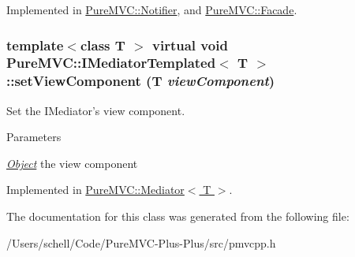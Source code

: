 Implemented in \hyperlink{class_pure_m_v_c_1_1_notifier_a55a358ee2661ecc08400653016fdb497}{PureMVC::Notifier}, and \hyperlink{class_pure_m_v_c_1_1_facade_a39a61e0a65d0f979848d36fe99cfd5f5}{PureMVC::Facade}.\hypertarget{class_pure_m_v_c_1_1_i_mediator_templated_a0eb50a31925283b7d6cdfe5b9dc90163}{
\subsubsection[{setViewComponent}]{\setlength{\rightskip}{0pt plus 5cm}template$<$class T $>$ virtual void {\bf PureMVC::IMediatorTemplated}$<$ T $>$::setViewComponent (T {\em viewComponent})}}
\label{class_pure_m_v_c_1_1_i_mediator_templated_a0eb50a31925283b7d6cdfe5b9dc90163}


Set the {\ttfamily IMediator}'s view component. 
\begin{DoxyParams}{Parameters}
\item[{\em \hyperlink{class_pure_m_v_c_1_1_object}{Object}}]the view component \end{DoxyParams}


Implemented in \hyperlink{class_pure_m_v_c_1_1_mediator_a4af88fe9aee0b74198d3d9b73ffe7779}{PureMVC::Mediator$<$ T $>$}.

The documentation for this class was generated from the following file:\begin{DoxyCompactItemize}
\item 
/Users/schell/Code/PureMVC-\/Plus-\/Plus/src/pmvcpp.h\end{DoxyCompactItemize}
